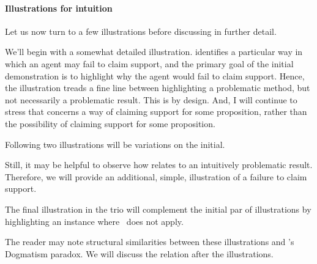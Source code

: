 \paragraph{Illustrations for intuition}

\begin{note}
  Let us now turn to a few illustrations before discussing \nI{} in further detail.

  We'll begin with a somewhat detailed illustration.
  \nI{} identifies a particular way in which an agent may fail to claim support, and the primary goal of the initial demonstration is to highlight why the agent would fail to claim support.
  Hence, the illustration treads a fine line between highlighting a problematic method, but not necessarily a problematic result.
  This is by design.
  And, I will continue to stress that \nI{} concerns a way of claiming support for some proposition, rather than the possibility of claiming support for some proposition.

  Following two illustrations will be variations on the initial.

  Still, it may be helpful to observe how \nI{} relates to an intuitively problematic result.
  Therefore, we will provide an additional, simple, illustration of a failure to claim support.

  The final illustration in the trio will complement the initial par of illustrations by highlighting an instance where~\nI{} does not apply.

  The reader may note structural similarities between these illustrations and \citeauthor{Kripke:2011wv}'s Dogmatism paradox.
  We will discuss the relation after the illustrations.
\end{note}

